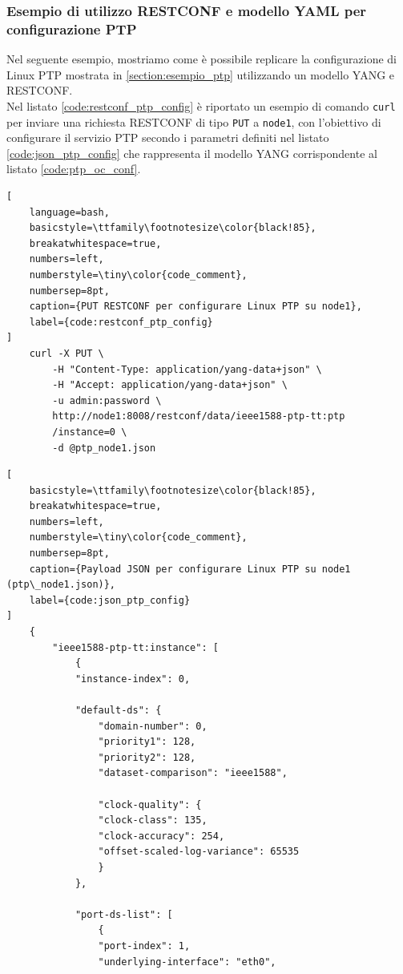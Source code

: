 \documentclass[12pt,a4paper,twoside]{book}
\begin{document}
\begin{onehalfspace}
\subsubsection{Esempio di utilizzo RESTCONF e modello YAML per configurazione PTP}
Nel seguente esempio, mostriamo come è possibile replicare la configurazione di Linux PTP mostrata in \ref{section:esempio_ptp} utilizzando un modello YANG e RESTCONF.
\\
Nel listato \ref{code:restconf_ptp_config} è riportato un esempio di comando \texttt{curl} per inviare una richiesta RESTCONF di tipo \texttt{PUT} a \texttt{node1}, con l'obiettivo di configurare il servizio PTP secondo i parametri definiti nel listato \ref{code:json_ptp_config} che rappresenta il modello YANG corrispondente al listato \ref{code:ptp_oc_conf}.

\begin{lstlisting}[
    language=bash,
    basicstyle=\ttfamily\footnotesize\color{black!85},
    breakatwhitespace=true,
    numbers=left,
    numberstyle=\tiny\color{code_comment},
    numbersep=8pt,
    caption={PUT RESTCONF per configurare Linux PTP su node1},
    label={code:restconf_ptp_config}
]
    curl -X PUT \
        -H "Content-Type: application/yang-data+json" \
        -H "Accept: application/yang-data+json" \
        -u admin:password \
        http://node1:8008/restconf/data/ieee1588-ptp-tt:ptp
        /instance=0 \
        -d @ptp_node1.json
\end{lstlisting}

\begin{lstlisting}[
    basicstyle=\ttfamily\footnotesize\color{black!85},
    breakatwhitespace=true,
    numbers=left,
    numberstyle=\tiny\color{code_comment},
    numbersep=8pt,
    caption={Payload JSON per configurare Linux PTP su node1 (ptp\_node1.json)},
    label={code:json_ptp_config}
]
    {
        "ieee1588-ptp-tt:instance": [
            {
            "instance-index": 0,

            "default-ds": {
                "domain-number": 0,
                "priority1": 128,
                "priority2": 128,
                "dataset-comparison": "ieee1588",

                "clock-quality": {
                "clock-class": 135,
                "clock-accuracy": 254,
                "offset-scaled-log-variance": 65535
                }
            },

            "port-ds-list": [
                {
                "port-index": 1,
                "underlying-interface": "eth0",


\end{lstlisting}
\end{onehalfspace}
\end{document}
